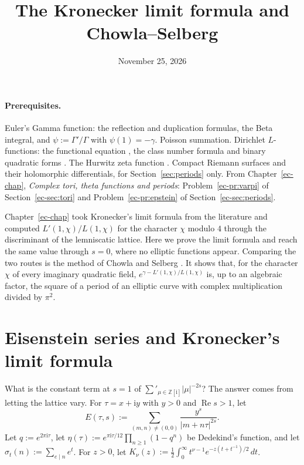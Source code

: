 \documentclass[reqno]{amsart}
\title{The Kronecker limit formula and Chowla--Selberg}
\author{}
\date{November 25, 2026}
\newcounter{chap}
\theoremstyle{definition}
\theoremstyle{plain}
\newcommand{\Z}{\mathbb{Z}}
\newcommand{\ii}{\mathrm{i}}
\begin{document}
\maketitle
{}\label{chap}

\paragraph{Prerequisites.}
Euler's Gamma function: the reflection and duplication formulas, the Beta integral, and \(\psi := \Gamma'/\Gamma\) with \(\psi(1) = -\gamma\).  Poisson summation.  Dirichlet \(L\)-functions: the functional equation \cite[Ch.~9]{Dav}, the class number formula and binary quadratic forms \cite[Ch.~6]{Dav}.  The Hurwitz zeta function \cite[Ch.~12]{Ap}.  Compact Riemann surfaces and their holomorphic differentials, for Section~\ref{sec:periods} only.  From Chapter~\ref{ec-chap}, \emph{Complex tori, theta functions and periods}: Problem~\ref{ec-pr:varpi} of Section~\ref{ec-sec:tori} and Problem~\ref{ec-pr:epstein} of Section~\ref{ec-sec:periods}.

Chapter~\ref{ec-chap} took Kronecker's limit formula from the literature and computed \(L'(1,\chi)/L(1,\chi)\) for the character \(\chi\) modulo \(4\) through the discriminant of the lemniscatic lattice.  Here we prove the limit formula and reach the same value through \(s = 0\), where no elliptic functions appear.  Comparing the two routes is the method of Chowla and Selberg \cite{CS}.  It shows that, for the character \(\chi\) of every imaginary quadratic field, \(e^{\gamma - L'(1,\chi)/L(1,\chi)}\) is, up to an algebraic factor, the square of a period of an elliptic curve with complex multiplication divided by \(\pi^2\).

\section{Eisenstein series and Kronecker's limit formula}\label{sec:klf}

What is the constant term at \(s = 1\) of \(\sum'_{\mu \in \Z[\ii]} \lvert\mu\rvert^{-2s}\)?  The answer comes from letting the lattice vary.  For \(\tau = x + \ii y\) with \(y > 0\) and \(\operatorname{Re} s > 1\), let
\[
  E(\tau, s) := \sum_{(m,n) \ne (0,0)} \frac{y^s}{\lvert m + n\tau\rvert^{2s}} .
\]
Let \(q := e^{2\pi\ii\tau}\), let \(\eta(\tau) := e^{\pi\ii\tau/12}\prod_{n \ge 1}(1 - q^n)\) be Dedekind's function, and let \(\sigma_t(n) := \sum_{e \mid n} e^t\).  For \(z > 0\), let \(K_\nu(z) := \tfrac12 \int_0^\infty t^{\nu - 1} e^{-z(t + t^{-1})/2} \, d t\).
\end{document}
